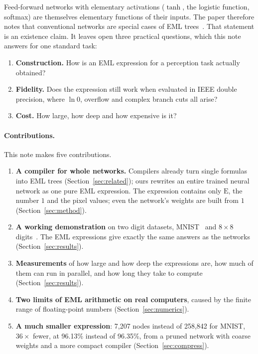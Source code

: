 \documentclass[11pt]{article}
\newcommand{\E}{\mathrm{E}}
\begin{document}
Feed-forward networks with elementary activations ($\tanh$, the logistic
function, softmax) are themselves elementary functions of their inputs. The
paper therefore notes that conventional networks are special cases of EML
trees~\cite{odrzywolek2026}. That statement is an existence claim. It leaves
open three practical questions, which this note answers for one standard
task:
\begin{enumerate}
  \item \textbf{Construction.} How is an EML expression for a perception task
        actually obtained?
  \item \textbf{Fidelity.} Does the expression still work when evaluated in
        IEEE double precision, where $\ln 0$, overflow and complex branch cuts
        all arise?
  \item \textbf{Cost.} How large, how deep and how expensive is it?
\end{enumerate}

\paragraph{Contributions.}
This note makes five contributions.
\begin{enumerate}
  \item \textbf{A compiler for whole networks.} Compilers already turn
        single formulas into EML trees (Section~\ref{sec:related}); ours
        rewrites an entire trained neural network as one pure EML
        expression. The expression contains only $\E$, the number $1$ and
        the pixel values; even the network's weights are built from $1$
        (Section~\ref{sec:method}).
  \item \textbf{A working demonstration} on two digit datasets,
        MNIST~\cite{lecun1998} and $8\times8$ digits~\cite{alpaydin1998}.
        The EML expressions give exactly the same answers as the networks
        (Section~\ref{sec:results}).
  \item \textbf{Measurements} of how large and how deep the expressions are,
        how much of them can run in parallel, and how long they take to
        compute (Section~\ref{sec:results}).
  \item \textbf{Two limits of EML arithmetic on real computers}, caused by
        the finite range of floating-point numbers
        (Section~\ref{sec:numerics}).
  \item \textbf{A much smaller expression}: 7{,}207 nodes instead of
        258{,}842 for MNIST, $36\times$ fewer, at 96.13\% instead of
        96.35\%, from a pruned network with coarse weights and a more compact
        compiler (Section~\ref{sec:compress}).
\end{enumerate}
\end{document}
